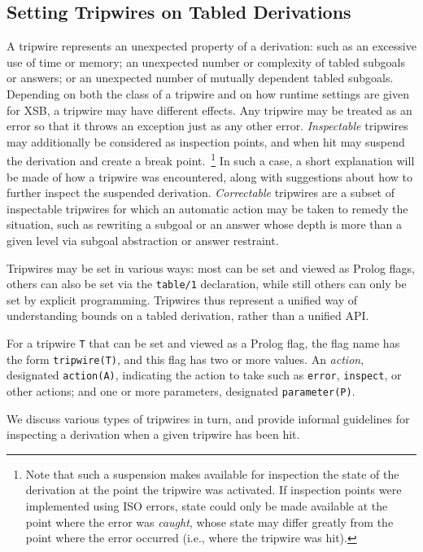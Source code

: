 \subsection{Setting Tripwires on Tabled Derivations} \label{sec:tripwire}
%
A tripwire represents an unexpected property of a derivation: such as
an excessive use of time or memory; an unexpected number or complexity
of tabled subgoals or answers; or an unexpected number of mutually
dependent tabled subgoals.  Depending on both the class of a tripwire
and on how runtime settings are given for XSB, a tripwire may have
different effects.  Any tripwire may be treated as an error so that it
throws an exception just as any other error.  {\em Inspectable}
tripwires may additionally be considered as inspection points, and
when hit may suspend the derivation and create a break
point.~\footnote{Note that such a suspension makes available for
  inspection the state of the derivation at the point the tripwire was
  activated.  If inspection points were implemented using ISO errors,
  state could only be made available at the point where the error was
  {\em caught}, whose state may differ greatly from the point where
  the error occurred (i.e., where the tripwire was hit).}
%
In such a case, a short explanation will be made of how a tripwire was
encountered, along with suggestions about how to further inspect the
suspended derivation.  {\em Correctable} tripwires are a subset of
inspectable tripwires for which an automatic action may be taken to
remedy the situation, such as rewriting a subgoal or an answer whose
depth is more than a given level via subgoal abstraction or answer
restraint.

Tripwires may be set in various ways: most can be set and viewed as
Prolog flags, others can also be set via the {\tt table/1}
declaration, while still others can only be set by explicit
programming.  Tripwires thus represent a unified way of understanding
bounds on a tabled derivation, rather than a unified API.

For a tripwire {\tt T} that can be set and viewed as a Prolog flag,
the flag name has the form {\tt tripwire(T)}, and this flag has two or
more values.  An {\em action}, designated {\tt action(A)}, indicating
the action to take such as {\tt error}, {\tt inspect}, or other
actions; and one or more parameters, designated {\tt parameter(P)}.

We discuss various types of tripwires in turn, and provide informal
guidelines for inspecting a derivation when a given tripwire has been
hit.

